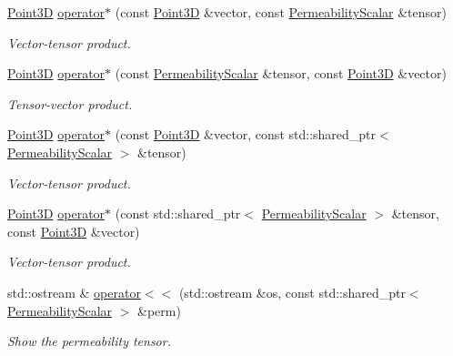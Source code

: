 \begin{DoxyCompactItemize}
\item 
\hyperlink{classFVCode3D_1_1Point3D}{Point3D} \hyperlink{classFVCode3D_1_1PermeabilityScalar_afc9f56f5ddf21944366100bd332dd2d0}{operator$\ast$} (const \hyperlink{classFVCode3D_1_1Point3D}{Point3D} \&vector, const \hyperlink{classFVCode3D_1_1PermeabilityScalar}{Permeability\+Scalar} \&tensor)
\begin{DoxyCompactList}\small\item\em Vector-\/tensor product. \end{DoxyCompactList}\item 
\hyperlink{classFVCode3D_1_1Point3D}{Point3D} \hyperlink{classFVCode3D_1_1PermeabilityScalar_a22554b5b0c67344107db774850c32949}{operator$\ast$} (const \hyperlink{classFVCode3D_1_1PermeabilityScalar}{Permeability\+Scalar} \&tensor, const \hyperlink{classFVCode3D_1_1Point3D}{Point3D} \&vector)
\begin{DoxyCompactList}\small\item\em Tensor-\/vector product. \end{DoxyCompactList}\item 
\hyperlink{classFVCode3D_1_1Point3D}{Point3D} \hyperlink{classFVCode3D_1_1PermeabilityScalar_a5ab8e51c1300aecb12b67af903effbff}{operator$\ast$} (const \hyperlink{classFVCode3D_1_1Point3D}{Point3D} \&vector, const std\+::shared\+\_\+ptr$<$ \hyperlink{classFVCode3D_1_1PermeabilityScalar}{Permeability\+Scalar} $>$ \&tensor)
\begin{DoxyCompactList}\small\item\em Vector-\/tensor product. \end{DoxyCompactList}\item 
\hyperlink{classFVCode3D_1_1Point3D}{Point3D} \hyperlink{classFVCode3D_1_1PermeabilityScalar_a7912ca0c304c291b77f75a2097cc006e}{operator$\ast$} (const std\+::shared\+\_\+ptr$<$ \hyperlink{classFVCode3D_1_1PermeabilityScalar}{Permeability\+Scalar} $>$ \&tensor, const \hyperlink{classFVCode3D_1_1Point3D}{Point3D} \&vector)
\begin{DoxyCompactList}\small\item\em Vector-\/tensor product. \end{DoxyCompactList}\item 
std\+::ostream \& \hyperlink{classFVCode3D_1_1PermeabilityScalar_aae99d1f7aa3acc5a770b721a1edb73d3}{operator$<$$<$} (std\+::ostream \&os, const std\+::shared\+\_\+ptr$<$ \hyperlink{classFVCode3D_1_1PermeabilityScalar}{Permeability\+Scalar} $>$ \&perm)
\begin{DoxyCompactList}\small\item\em Show the permeability tensor. \end{DoxyCompactList}\end{DoxyCompactItemize}
